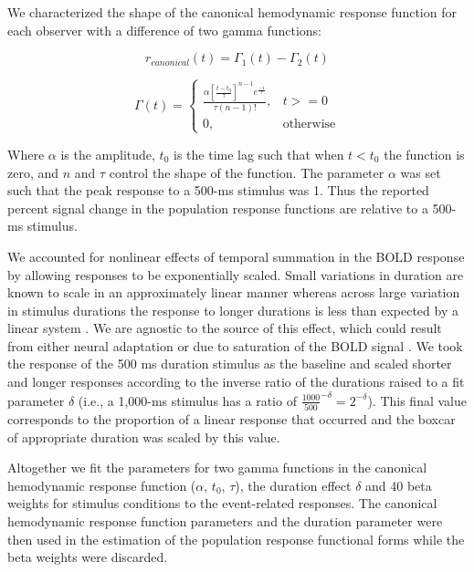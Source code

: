 We characterized the shape of the canonical hemodynamic response function for each observer with a difference of two gamma functions:

\begin{equation}
    r_{canonical}(t) = \Gamma_1(t)-\Gamma_2(t)
\end{equation}

\begin{equation}
    \Gamma(t)=
\begin{cases}
    \frac{\alpha[\frac{t-t_0}{\tau}]^{n-1}e^{\frac{-1}{\tau}}}{\tau(n-1)!},& t >= 0\\
    0,              & \text{otherwise}
\end{cases}
\end{equation}

Where $\alpha$ is the amplitude, $t_0$ is the time lag such that when $t < t_0$ the function is zero, and $n$ and $\tau$ control the shape of the function. The parameter $\alpha$ was set such that the peak response to a 500-ms stimulus was 1. Thus the reported percent signal change in the population response functions are relative to a 500-ms stimulus.

We accounted for nonlinear effects of temporal summation in the BOLD response by allowing responses to be exponentially scaled. Small variations in duration are known to scale in an approximately linear manner \citep{Boynton1996-ff} whereas across large variation in stimulus durations the response to longer durations is less than expected by a linear system \citep{Boynton2012-xy}. We are agnostic to the source of this effect, which could result from either neural adaptation \citep{Buxton2004-rg} or due to saturation of the BOLD signal \citep{Friston1998-bo}. We took the response of the 500 ms duration stimulus as the baseline and scaled shorter and longer responses according to the inverse ratio of the durations raised to a fit parameter $\delta$ (i.e., a 1,000-ms stimulus has a ratio of $\frac{1000}{500}^{-\delta}=2^{-\delta}$). This final value corresponds to the proportion of a linear response that occurred and the boxcar of appropriate duration was scaled by this value.

Altogether we fit the parameters for two gamma functions in the canonical hemodynamic response function ($\alpha$, $t_0$, $\tau$), the duration effect $\delta$ and 40 beta weights for stimulus conditions to the event-related responses. The canonical hemodynamic response function parameters and the duration parameter were then used in the estimation of the population response functional forms while the beta weights were discarded.

